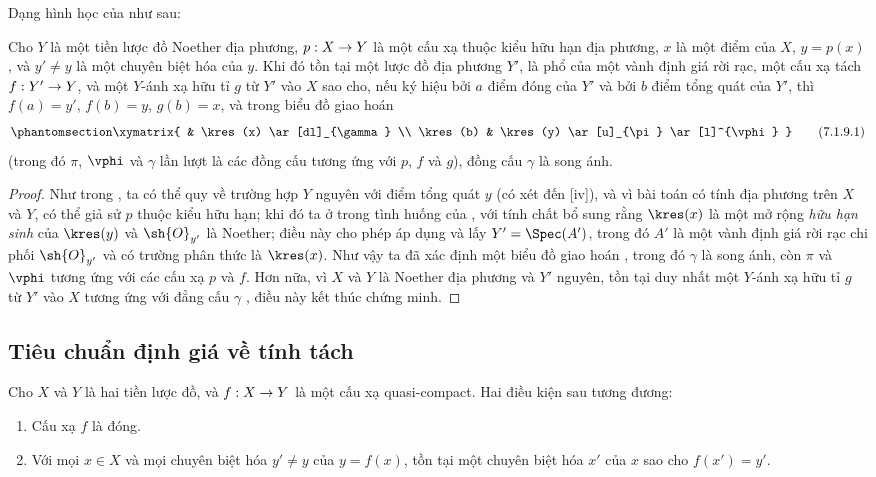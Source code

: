 \documentclass[oneside,10pt]{amsart}
\makeatletter
\newcommand{\ega@arrow}[2]{\mathchoice{#1}{#2}{#2}{#2}}
\renewcommand{\to}{\ega@arrow{\longrightarrow}{\rightarrow}}
\newcommand{\oldpage}[2][]{\marginnote{\normalfont\footnotesize\textbf{#1}~|~#2}\ignorespaces}
\let\EGAOriginalLabel\label
\renewcommand{\label}[1]{\phantomsection\EGAOriginalLabel{#1}}
\makeatother
\begin{document}
Dạng hình học của  như sau:
\oldpage[II]{141}
\begin{proposition}[7.1.9]
\label{II.7.1.9}
Cho $Y$ là một tiền lược đồ Noether địa phương, $p:X\to Y$ là một cấu xạ thuộc kiểu hữu hạn địa phương, $x$ là một điểm của $X$, $y=p(x)$, và $y'\neq y$ là một chuyên biệt hóa của $y$.
Khi đó tồn tại một lược đồ địa phương $Y'$, là phổ của một vành định giá rời rạc, một cấu xạ tách $f:Y'\to Y$, và một $Y$-ánh xạ hữu tỉ $g$ từ $Y'$ vào $X$ sao cho, nếu ký hiệu bởi $a$ điểm đóng của $Y'$ và bởi $b$ điểm tổng quát của $Y'$, thì $f(a)=y'$, $f(b)=y$, $g(b)=x$, và trong biểu đồ giao hoán
\[
\label{II.7.1.9.1}
    \xymatrix{
        & \kres(x) \ar[dl]_{\gamma}
    \\  \kres(b)
        & \kres(y) \ar[u]_{\pi} \ar[l]^{\vphi}
    }
\tag{7.1.9.1}
\]
(trong đó $\pi$, $\vphi$ và $\gamma$ lần lượt là các đồng cấu tương ứng với $p$, $f$ và $g$), đồng cấu $\gamma$ là song ánh.
\end{proposition}

\begin{proof}
Như trong , ta có thể quy về trường hợp $Y$ nguyên với điểm tổng quát $y$ (có xét đến [iv]), và vì bài toán có tính địa phương trên $X$ và $Y$, có thể giả sử $p$ thuộc kiểu hữu hạn;
khi đó ta ở trong tình huống của , với tính chất bổ sung rằng $\kres(x)$ là một mở rộng \emph{hữu hạn sinh} của $\kres(y)$  và $\sh{O}_{y'}$ là Noether;
điều này cho phép áp dụng  và lấy $Y'=\Spec(A')$, trong đó $A'$ là một vành định giá rời rạc chi phối $\sh{O}_{y'}$ và có trường phân thức là $\kres(x)$.
Như vậy ta đã xác định một biểu đồ giao hoán , trong đó $\gamma$ là song ánh, còn $\pi$ và $\vphi$ tương ứng với các cấu xạ $p$ và $f$.
Hơn nữa, vì $X$ và $Y$ là Noether địa phương  và $Y'$ nguyên, tồn tại duy nhất một $Y$-ánh xạ hữu tỉ $g$ từ $Y'$ vào $X$ tương ứng với đẳng cấu $\gamma$ , điều này kết thúc chứng minh.
\end{proof}

\subsection{Tiêu chuẩn định giá về tính tách}
\label{subsection:II.7.2}

\begin{proposition}[7.2.1]
\label{II.7.2.1}
Cho $X$ và $Y$ là hai tiền lược đồ, và $f:X\to Y$ là một cấu xạ quasi-compact.
Hai điều kiện sau tương đương:
\begin{enumerate}
    \item[\rm{(a)}] Cấu xạ $f$ là đóng.
    \item[\rm{(b)}] Với mọi $x\in X$ và mọi chuyên biệt hóa $y'\neq y$ của $y=f(x)$, tồn tại một chuyên biệt hóa $x'$ của $x$ sao cho $f(x')=y'$.
\end{enumerate}
\end{proposition}
\end{document}
